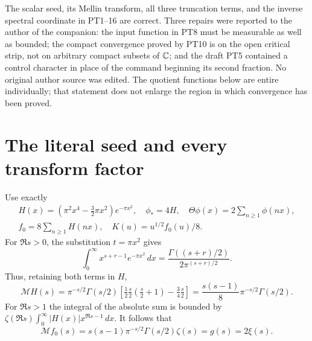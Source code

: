 The scalar seed, its Mellin transform, all three truncation terms,
and the inverse spectral coordinate in PT1--16 are correct.
Three repairs were reported to the author of the companion:
the input function in PT8 must be measurable as well as bounded;
the compact convergence proved by PT10 is on the open critical strip,
not on arbitrary compact subsets of $\mathbb C$;
and the draft PT5 contained a control character in place of
the command beginning its second fraction. No original author
source was edited. The quotient functions below are entire individually;
that statement does not enlarge the region in which convergence has
been proved.

\section{The literal seed and every transform factor}
Use exactly
\[
 \begin{gathered}
 H(x)=(\pi^2x^4-\tfrac32\pi x^2)e^{-\pi x^2},\quad
 \phi_*=4H,\quad \Theta\phi(x)=2\sum_{n\ge1}\phi(nx),\\
 f_0=8\sum_{n\ge1}H(nx),\quad K(u)=u^{1/2}f_0(u)/8.
 \end{gathered}
\]
For $\Re s>0$, the substitution $t=\pi x^2$ gives
\[
 \int_0^\infty x^{s+r-1}e^{-\pi x^2}\,dx
 =\frac{\Gamma((s+r)/2)}{2\pi^{(s+r)/2}}.
\]
Thus, retaining both terms in $H$,
\begin{equation}\tag{IC1}
 \mathcal MH(s)=\pi^{-s/2}\Gamma(s/2)
 \left[\tfrac12\tfrac s2(\tfrac s2+1)-\tfrac34\tfrac s2\right]
 =\frac{s(s-1)}8\pi^{-s/2}\Gamma(s/2).
\end{equation}
For $\Re s>1$ the integral of the absolute sum is bounded by
$\zeta(\Re s)\int_0^\infty|H(x)|x^{\Re s-1}\,dx$.
It follows that
\[
 \mathcal Mf_0(s)=s(s-1)\pi^{-s/2}\Gamma(s/2)\zeta(s)=g(s)=2\xi(s).
\]


